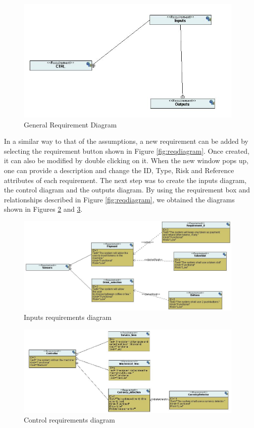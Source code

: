 \documentclass[12pt]{article}
\begin{document}
\begin{figure}[htbp]
\centering
\includegraphics[width=0.99\textwidth]{fig/reqgeneral.jpg}
\caption{General Requirement Diagram} \label{fig:reqgeneral}
\end{figure}


In a similar way to that of the assumptions, a new requirement can be added by selecting the requirement button shown in Figure \ref{fig:reqdiagram}. Once created, it can also be modified by double clicking on it. When the new window pops up, one can provide a description and change the ID, Type, Risk and Reference attributes of each requirement.
	The next step was to create the inputs diagram, the control diagram and the outputs diagram. By using the requirement box and relationships described in Figure \ref{fig:reqdiagram}, we obtained the diagrams shown in Figures \ref{fig:inputreq} and \ref{fig:controlreq}. 

\begin{figure}[htbp]
\centering
\includegraphics[width=0.99\textwidth]{fig/inputreq.jpg}
\caption{Inputs requirements diagram} \label{fig:inputreq}
\end{figure}

\begin{figure}[htbp]
\centering
\includegraphics[width=0.99\textwidth]{fig/controlreq.jpg}
\caption{Control requirements diagram} \label{fig:controlreq}
\end{figure}
\end{document}
